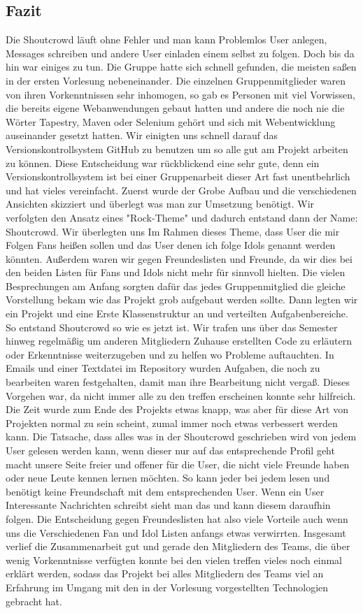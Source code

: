 \documentclass[12pt,a4paper]{article}
\begin{document}
\subsection{Fazit}
Die Shoutcrowd läuft ohne Fehler und man kann Problemlos User anlegen, Messages schreiben und andere User einladen einem selbst zu folgen. Doch bis da hin war einiges zu tun.
Die Gruppe hatte sich schnell gefunden, die meisten saßen in der ersten Vorlesung nebeneinander.
Die einzelnen Gruppenmitglieder waren von ihren Vorkenntnissen sehr inhomogen, so gab es Personen mit viel Vorwissen, die bereits eigene Webanwendungen gebaut hatten und andere die noch nie die Wörter Tapestry, Maven oder Selenium gehört und sich mit Webentwicklung auseinander gesetzt hatten.
Wir einigten uns schnell darauf das Versionskontrollsystem GitHub zu benutzen um so alle gut am Projekt arbeiten zu können. Diese Entscheidung war rückblickend eine sehr gute, denn ein Versionskontrollsystem ist bei einer Gruppenarbeit dieser Art fast unentbehrlich und hat vieles vereinfacht.
Zuerst wurde der Grobe Aufbau und die verschiedenen Ansichten skizziert und überlegt was man zur Umsetzung benötigt. Wir verfolgten den Ansatz eines "Rock-Theme" und dadurch entstand dann der Name: Shoutcrowd. Wir überlegten uns Im Rahmen dieses Theme, dass User die mir Folgen Fans heißen sollen und das User denen ich folge Idols genannt werden könnten. Außerdem waren wir gegen Freundeslisten und Freunde, da wir dies bei den beiden Listen für Fans und Idols nicht mehr für sinnvoll hielten. Die vielen Besprechungen am Anfang sorgten dafür das jedes Gruppenmitglied die gleiche Vorstellung bekam wie das Projekt grob aufgebaut werden sollte.
Dann legten wir ein Projekt und eine Erste Klassenstruktur an und verteilten Aufgabenbereiche. So entstand Shoutcrowd so wie es jetzt ist. Wir trafen uns über das Semester hinweg regelmäßig um anderen Mitgliedern Zuhause erstellten Code zu erläutern oder Erkenntnisse weiterzugeben und zu helfen wo Probleme auftauchten. In Emails und einer Textdatei im Repository wurden Aufgaben, die noch zu bearbeiten waren festgehalten, damit man ihre Bearbeitung nicht vergaß. Dieses Vorgehen war, da nicht immer alle zu den treffen erscheinen konnte sehr hilfreich.
Die Zeit wurde zum Ende des Projekts etwas knapp, was aber für diese Art von Projekten normal zu sein scheint, zumal immer noch etwas verbessert werden kann.
Die Tatsache, dass alles was in der Shoutcrowd geschrieben wird von jedem User gelesen werden kann, wenn dieser nur auf das entsprechende Profil geht macht unsere Seite freier und offener für die User, die nicht viele Freunde haben oder neue Leute kennen lernen möchten. So kann jeder bei jedem lesen und benötigt keine Freundschaft mit dem entsprechenden User. Wenn ein User Interessante Nachrichten schreibt sieht man das und kann diesem daraufhin folgen. Die Entscheidung gegen Freundeslisten hat also viele Vorteile auch wenn uns die Verschiedenen Fan und Idol Listen anfangs etwas verwirrten.
Insgesamt verlief die Zusammenarbeit gut und gerade den Mitgliedern des Teams, die über wenig Vorkenntnisse verfügten konnte bei den vielen treffen vieles noch einmal erklärt werden, sodass das Projekt bei alles Mitgliedern des Teams viel an Erfahrung im Umgang mit den in der Vorlesung vorgestellten Technologien gebracht hat.
\end{document}
